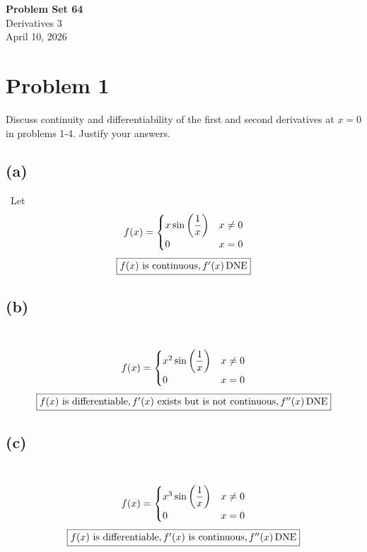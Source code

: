 \documentclass[12pt]{article}
\newcommand*{\paren}[1]{\ensuremath\left(#1\right)}
\newcommand{\vem}{\vspace{0.5em}}
\newcommand{\problem}[1]{\section{Problem #1}}
\newcommand{\subproblem}[1]{\subsection{(#1)} \,}
\DeclareMathOperator{\dne}{DNE}
\begin{document}
\vspace*{0cm}

\begin{center}
    {\Large \bfseries Problem Set 64} \\[0.5cm]
    {\large Derivatives 3} \\[0.35cm]
    {\normalsize April 10, 2026}
\end{center}


\problem{1}
Discuss continuity and differentiability of the first and second derivatives at $x = 0$ in problems 1-4. Justify your answers. \vem 

\subproblem{a} Let
\[
f(x)=\begin{cases}
    x \sin \paren{\dfrac{1}{x}} &x\ne 0\\
    0 &x=0
\end{cases}
\]
\[
\boxed{f(x) $ is continuous$,
    f'(x) \dne }
\]

\subproblem{b}
\[
f(x)=\begin{cases}
    x^2 \sin \paren{\dfrac{1}{x}} &x\ne 0\\
    0 &x=0
\end{cases}
\]
\[
\boxed{f(x) $ is differentiable$,
    f'(x) $ exists but is not continuous$,
    f''(x) \dne}
\]

\subproblem{c}
\[
f(x)=\begin{cases}
    x^3 \sin \paren{\dfrac{1}{x}} &x\ne 0\\
    0 &x=0
\end{cases}
\]
\[
\boxed{f(x) $ is differentiable$,
    f'(x) $ is continuous$,
    f''(x) \dne}
\]
\end{document}

